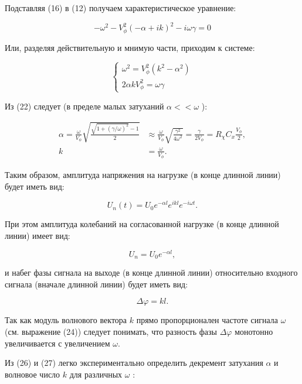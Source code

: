 \documentclass[a4paper,12 pt]{article}
\begin{document}
Подставляя (16) в (12) получаем характеристическое уравнение:


\begin{equation*}
-\omega^{2}-V_{\phi}^{2}(-\alpha+i k)^{2}-i \omega \gamma=0 \tag{21}
\end{equation*}


Или, разделяя действительную и мнимую части, приходим к системе:

\[
\left\{\begin{array}{l}
\omega^{2}=V_{\phi}^{2}\left(k^{2}-\alpha^{2}\right)  \tag{22}\\
2 \alpha k V_{\phi}^{2}=\omega \gamma
\end{array}\right.
\]

Из (22) следует (в пределе малых затуханий $\alpha<<\omega$ ):


\begin{align*}
\alpha=\frac{\omega}{V_{\phi}} \sqrt{\frac{\sqrt{1+(\gamma / \omega)^{2}}-1}{2}} & \approx \frac{\omega}{V_{\phi}} \sqrt{\frac{\gamma^{2}}{4 \omega^{2}}}=\frac{\gamma}{2 V_{\phi}}=R_{\chi} C_{x} \frac{V_{\phi}}{2},  \tag{23}\\
k & =\frac{\omega}{V_{\phi}} . \tag{24}
\end{align*}


Таким образом, амплитуда напряжения на нагрузке (в конце длинной линии) будет иметь вид:


\begin{equation*}
U_{n}(t)=U_{0} e^{-\alpha l} e^{i k l} e^{-i \omega t} . \tag{25}
\end{equation*}


При этом амплитуда колебаний на согласованной нагрузке (в конце длинной линии) имеет вид:


\begin{equation*}
U_{n}=U_{0} e^{-\alpha l}, \tag{26}
\end{equation*}


и набег фазы сигнала на выходе (в конце длинной линии) относительно входного сигнала (вначале длинной линии) будет иметь вид:


\begin{equation*}
\Delta \varphi=k l . \tag{27}
\end{equation*}


Так как модуль волнового вектора $k$ прямо пропорционален частоте сигнала $\omega$ (см. выражение (24)) следует понимать, что разность фазы $\Delta \varphi$ монотонно увеличивается с увеличением $\omega$.

Из (26) и (27) легко экспериментально определить декремент затухания $\alpha$ и волновое число $k$ для различных $\omega$ :
\end{document}

